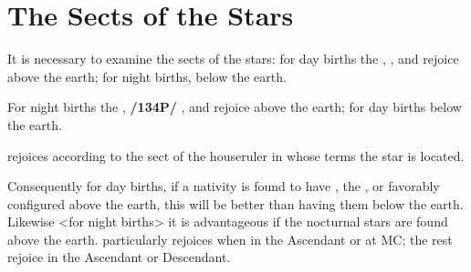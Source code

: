 \section{The Sects of the Stars}

It is necessary to examine the sects of the stars: for day births the \Sun, \Jupiter, and \Saturn\xspace rejoice above the earth; for night births, below the earth. 

For night births the \Moon, \textbf{/134P/} \Mars, and \Venus\xspace rejoice above the earth; for day births below the earth. 

\Mercury\xspace rejoices according to the sect of the houseruler in whose terms the star is located. 

Consequently for day births, if a nativity is found to have \Jupiter, the \Sun, or \Saturn favorably configured above the earth, this will be better than having them below the earth.
Likewise <for night births> it is advantageous if the nocturnal stars are found above the earth. \Venus\xspace
particularly rejoices when in the Ascendant or at MC; the rest rejoice in the Ascendant or Descendant.

\newpage